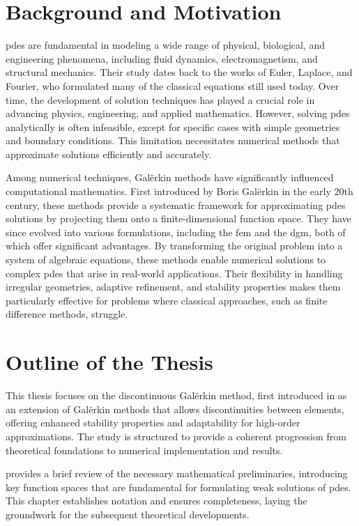 \section{Background and Motivation}

\acrfull{pdes} are fundamental in modeling a wide range of physical, biological, and engineering phenomena, including fluid dynamics, electromagnetism, and structural mechanics. Their study dates back to the works of Euler, Laplace, and Fourier, who formulated many of the classical equations still used today. Over time, the development of solution techniques has played a crucial role in advancing physics, engineering, and applied mathematics. However, solving \acrshort{pdes} analytically is often infeasible, except for specific cases with simple geometries and boundary conditions. This limitation necessitates numerical methods that approximate solutions efficiently and accurately.

Among numerical techniques, Galërkin methods have significantly influenced computational mathematics. First introduced by Boris Galërkin in the early 20th century, these methods provide a systematic framework for approximating \acrshort{pdes} solutions by projecting them onto a finite-dimensional function space. They have since evolved into various formulations, including the \acrfull{fem} and the \acrfull{dgm}, both of which offer significant advantages. By transforming the original problem into a system of algebraic equations, these methods enable numerical solutions to complex \acrshort{pdes} that arise in real-world applications. Their flexibility in handling irregular geometries, adaptive refinement, and stability properties makes them particularly effective for problems where classical approaches, such as finite difference methods, struggle.

\newpage
\section{Outline of the Thesis}

This thesis focuses on the discontinuous Galërkin method, first introduced in  as an extension of Galërkin methods that allows discontinuities between elements, offering enhanced stability properties and adaptability for high-order approximations. The study is structured to provide a coherent progression from theoretical foundations to numerical implementation and results.

 provides a brief review of the necessary mathematical preliminaries, introducing key function spaces that are fundamental for formulating weak solutions of \acrshort{pdes}. This chapter establishes notation and ensures completeness, laying the groundwork for the subsequent theoretical developments.

